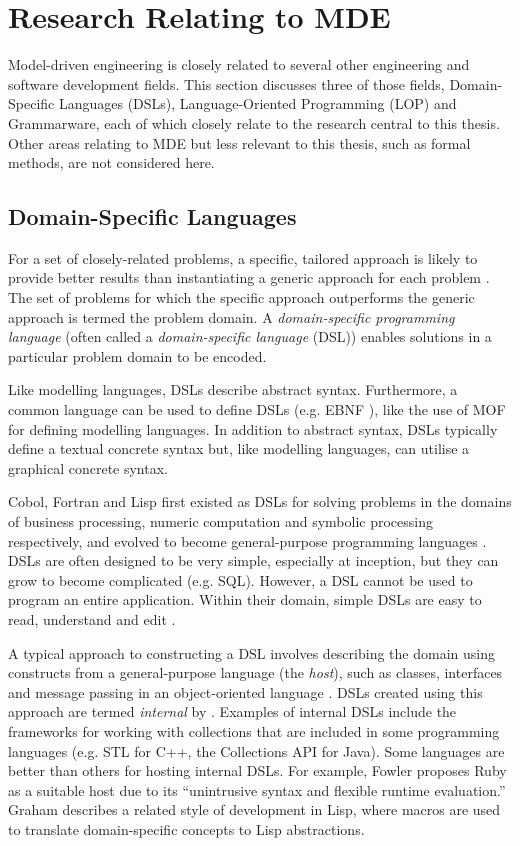 
\section{Research Relating to MDE}
\label{sec:mde_related}
Model-driven engineering is closely related to several other engineering and software development fields. This section discusses three of those fields, Domain-Specific Languages (DSLs), Language-Oriented Programming (LOP) and Grammarware, each of which closely relate to the research central to this thesis. Other areas relating to MDE but less relevant to this thesis, such as formal methods, are not considered here.

\subsection{Domain-Specific Languages}
For a set of closely-related problems, a specific, tailored approach is likely to provide better results than instantiating a generic approach for each problem \cite{deursen00dslbib}. The set of problems for which the specific approach outperforms the generic approach is termed the problem domain. A \textit{domain-specific programming language} (often called a \textit{domain-specific language} (DSL)) enables solutions in a particular problem domain to be encoded.

Like modelling languages, DSLs describe abstract syntax. Furthermore, a common language can be used to define DSLs (e.g. EBNF \cite{ebnf}), like the use of MOF for defining modelling languages. In addition to abstract syntax, DSLs typically define a textual concrete syntax but, like modelling languages, can utilise a graphical concrete syntax.

Cobol, Fortran and Lisp first existed as DSLs for solving problems in the domains of business processing, numeric computation and symbolic processing respectively, and evolved to become general-purpose programming languages \cite{deursen00dslbib}. DSLs are often designed to be very simple, especially at inception, but they can grow to become complicated (e.g. SQL). However, a DSL cannot be used to program an entire application. Within their domain, simple DSLs are easy to read, understand and edit \cite{fowler05language}.

A typical approach to constructing a DSL involves describing the domain using constructs from a general-purpose language (the \textit{host}), such as classes, interfaces and message passing in an object-oriented language \cite{dmitriev04lop}. DSLs created using this approach are termed \emph{internal} by \cite{fowler10dsls}. Examples of internal DSLs include the frameworks for working with collections that are included in some programming languages (e.g. STL for C++, the Collections API for Java). Some languages are better than others for hosting internal DSLs. For example, Fowler \cite{fowler05language} proposes Ruby as a suitable host due to its ``unintrusive syntax and flexible runtime evaluation.'' Graham \cite{graham93lisp} describes a related style of development in Lisp, where macros are used to translate domain-specific concepts to Lisp abstractions.

